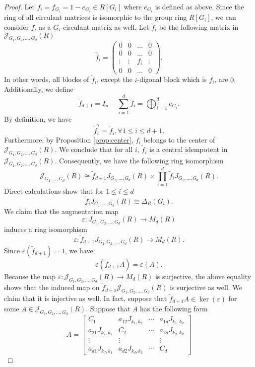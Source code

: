 \documentclass[12pt, a4paper]{amsart}
\numberwithin{equation}{section} %
\theoremstyle{plain}
\theoremstyle{definition}
\theoremstyle{plain}
\theoremstyle{remark}
\newcommand{\sJ}{\mathcal{J}}
\begin{document}
\begin{proof}
Let $f_i=f_{G_i}=1-e_{G_i} \in R[G_i]$ where $e_{G_i}$ is defined as above. Since the ring of all circulant matrices is isomorphic to the group ring $R[G_i]$, we can consider $f_i$ as a $G_i$-circulant matrix as well. Let $\tilde{f}_i$ be the following matrix in $\sJ_{G_1, G_2, \ldots, G_d}(R)$
\[
\tilde{f}_i =\left(\begin{array}{c|c|c|c}
0 & 0 & \dots & 0 \\
\hline
0 & 0 & \dots & 0 \\
\hline
\vdots & \vdots & f_i & \vdots\\
\hline
0 & 0 & \dots & 0
\end{array}
\right).
\]
In other words, all blocks of $\tilde{f}_i$, except the $i$-digonal block which is $f_i$,  are $0.$  Additionally, we define 
\[ \tilde{f}_{d+1}=I_n-\sum_{i=1}^d \tilde{f}_i=\bigoplus_{i=1}^{d} e_{G_i}. \] 
By definition, we have 
\[ \tilde{f}_i^2 = \tilde{f}_i, \forall 1 \leq i \leq d+1 .\]
Furthermore, by Proposition \ref{prop:center}, $f_i$ belongs to the center of $\sJ_{G_1, G_2, \ldots, G_d}(R).$ We conclude that for all $i$, $\tilde{f}_i$ is a central idempotent in $\sJ_{G_1, G_2, \ldots,G_d}(R).$ Consequently, we have the following ring isomorphism 
\[ \sJ_{G_1, \ldots, G_d}(R) \cong \tilde{f}_{d+1} J_{G_1, \ldots, G_d}(R) \times \prod_{i=1}^d \tilde{f}_{i} J_{G_1, \ldots, G_d}(R) .\] 
Direct calculations show that for $1 \leq i \leq d$ 
\[ \tilde{f}_{i} J_{G_1, \ldots, G_d}(R) \cong \Delta_R(G_i) .\] We claim that the augmentation map 
\[ \varepsilon: J_{G_1, G_2, \ldots, G_d}(R) \to M_d(R) \] 
induces a ring isomorphism 
\[ \varepsilon: \tilde{f}_{d+1} J_{G_1, G_2, \ldots, G_d}(R) \to M_d(R).\] 
Since $\varepsilon(\tilde{f}_{d+1})=1$, we have 
\[ \varepsilon(\tilde{f}_{d+1} A) = \varepsilon(A) .\] 
Because the map $\varepsilon: \sJ_{G_1, G_2, \ldots, G_d}(R) \to M_d(R)$ is surjective, the above equality shows that the induced map on $\tilde{f}_{d+1} \sJ_{G_1, G_2, \ldots, G_d}(R)$ is surjective as well. We claim that it is injective as well. In fact, suppose that $\tilde{f}_{d+1} A \in \ker(\varepsilon)$ for some $A \in \sJ_{G_1, G_2, \ldots, G_d}(R).$ Suppose that $A$ has the following form 
\[A=\begin{bmatrix} 
C_1&a_{12} J_{k_1,k_2} &\cdots & a_{1d}J_{k_1,k_d}\\
a_{21}J_{k_2,k_1} &C_2 &\cdots & a_{2d}J_{k_2,k_d}\\
\vdots&\vdots& &\vdots\\
a_{d1}J_{k_d,k_1}&a_{d2}J_{k_d,k_2}&\cdots& C_d

\end{bmatrix}\]
\end{proof}
\end{document}
